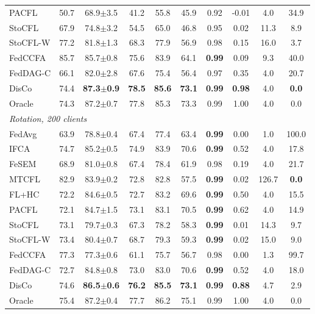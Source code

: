 \begin{tabular}{lccccccccc}
PACFL & 50.7 & 68.9$\pm$3.5 & 41.2 & 55.8 & 45.9 & 0.92 & -0.01 & 4.0 & 34.9 \\
StoCFL & 67.9 & 74.8$\pm$3.2 & 54.5 & 65.0 & 46.8 & 0.95 & 0.02 & 11.3 & 8.9 \\
StoCFL-W & 77.2 & 81.8$\pm$1.3 & 68.3 & 77.9 & 56.9 & 0.98 & 0.15 & 16.0 & 3.7 \\
FedCCFA & 85.7 & 85.7$\pm$0.8 & 75.6 & 83.9 & 64.1 & \textbf{0.99} & 0.09 & 9.3 & 40.0 \\
FedDAG-C & 66.1 & 82.0$\pm$2.8 & 67.6 & 75.4 & 56.4 & 0.97 & 0.35 & 4.0 & 20.7 \\
DisCo & 74.4 & \textbf{87.3$\pm$0.9} & \textbf{78.5} & \textbf{85.6} & \textbf{73.1} & \textbf{0.99} & \textbf{0.98} & 4.0 & \textbf{0.0} \\
Oracle & 74.3 & 87.2$\pm$0.7 & 77.8 & 85.3 & 73.3 & 0.99 & 1.00 & 4.0 & 0.0 \\
\midrule
\multicolumn{10}{l}{\textit{Rotation, 200 clients}}\\
FedAvg & 63.9 & 78.8$\pm$0.4 & 67.4 & 77.4 & 63.4 & \textbf{0.99} & 0.00 & 1.0 & 100.0 \\
IFCA & 74.7 & 85.2$\pm$0.5 & 74.9 & 83.9 & 70.6 & \textbf{0.99} & 0.52 & 4.0 & 17.8 \\
FeSEM & 68.9 & 81.0$\pm$0.8 & 67.4 & 78.4 & 61.9 & 0.98 & 0.19 & 4.0 & 21.7 \\
MTCFL & 82.9 & 83.9$\pm$0.2 & 72.8 & 82.8 & 57.5 & \textbf{0.99} & 0.02 & 126.7 & \textbf{0.0} \\
FL+HC & 72.2 & 84.6$\pm$0.5 & 72.7 & 83.2 & 69.6 & \textbf{0.99} & 0.50 & 4.0 & 15.5 \\
PACFL & 72.1 & 84.7$\pm$1.5 & 73.1 & 83.1 & 70.5 & \textbf{0.99} & 0.62 & 4.0 & 14.9 \\
StoCFL & 73.1 & 79.7$\pm$0.3 & 67.3 & 78.2 & 58.3 & \textbf{0.99} & 0.01 & 14.3 & 9.7 \\
StoCFL-W & 73.4 & 80.4$\pm$0.7 & 68.7 & 79.3 & 59.3 & \textbf{0.99} & 0.02 & 15.0 & 9.0 \\
FedCCFA & 77.3 & 77.3$\pm$0.6 & 61.1 & 75.7 & 56.7 & 0.98 & 0.00 & 1.3 & 99.7 \\
FedDAG-C & 72.7 & 84.8$\pm$0.8 & 73.0 & 83.0 & 70.6 & \textbf{0.99} & 0.52 & 4.0 & 18.0 \\
DisCo & 74.6 & \textbf{86.5$\pm$0.6} & \textbf{76.2} & \textbf{85.5} & \textbf{73.1} & \textbf{0.99} & \textbf{0.88} & 4.7 & 2.9 \\
Oracle & 75.4 & 87.2$\pm$0.4 & 77.7 & 86.2 & 75.1 & 0.99 & 1.00 & 4.0 & 0.0 \\
\bottomrule
\end{tabular}
